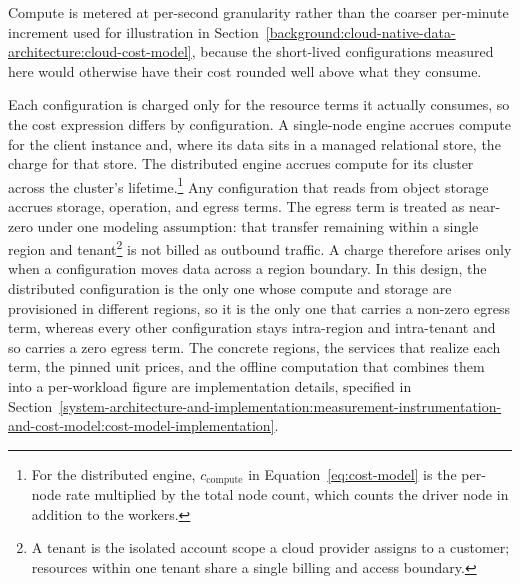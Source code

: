 Compute is metered at per-second granularity rather than the coarser per-minute increment used for illustration in Section~\ref{background:cloud-native-data-architecture:cloud-cost-model}, because the short-lived configurations measured here would otherwise have their cost rounded well above what they consume.

Each configuration is charged only for the resource terms it actually consumes, so the cost expression differs by configuration. A single-node engine accrues compute for the client instance and, where its data sits in a managed relational store, the charge for that store. The distributed engine accrues compute for its cluster across the cluster's lifetime.\footnote{For the distributed engine, $c_{\text{compute}}$ in Equation~\ref{eq:cost-model} is the per-node rate multiplied by the total node count, which counts the driver node in addition to the workers.} Any configuration that reads from object storage accrues storage, operation, and egress terms. The egress term is treated as near-zero under one modeling assumption: that transfer remaining within a single region and tenant\footnote{A tenant is the isolated account scope a cloud provider assigns to a customer; resources within one tenant share a single billing and access boundary.} is not billed as outbound traffic. A charge therefore arises only when a configuration moves data across a region boundary. In this design, the distributed configuration is the only one whose compute and storage are provisioned in different regions, so it is the only one that carries a non-zero egress term, whereas every other configuration stays intra-region and intra-tenant and so carries a zero egress term. The concrete regions, the services that realize each term, the pinned unit prices, and the offline computation that combines them into a per-workload figure are implementation details, specified in Section~\ref{system-architecture-and-implementation:measurement-instrumentation-and-cost-model:cost-model-implementation}.